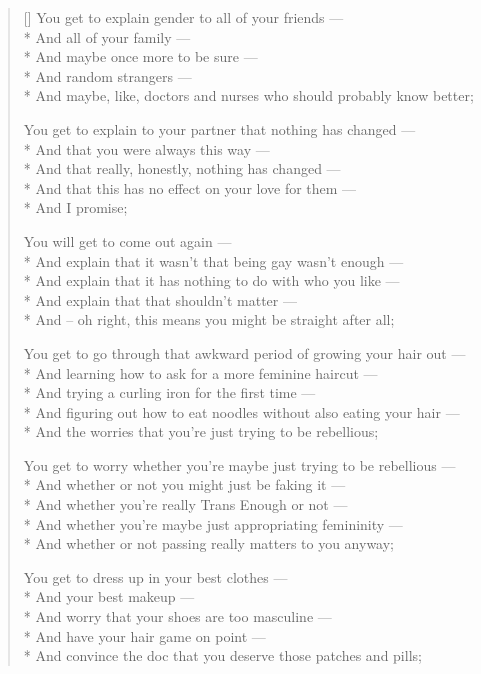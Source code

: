 \begin{verse}[\textwidth]
  You get to explain gender to all of your friends ---\\*
  \vin And all of your family ---\\*
  \vin And maybe once more to be sure ---\\*
  \vin And random strangers ---\\*
  \vin And maybe, like, doctors and nurses who should probably know better;

  You get to explain to your partner that nothing has changed ---\\*
  \vin And that you were always this way ---\\*
  \vin And that really, honestly, nothing has changed ---\\*
  \vin And that this has no effect on your love for them ---\\*
  \vin And I promise;

  You will get to come out again ---\\*
  \vin And explain that it wasn't that being gay wasn't enough ---\\*
  \vin And explain that it has nothing to do with who you like ---\\*
  \vin And explain that that shouldn't matter ---\\*
  \vin And -- oh right, this means you might be straight after all;

  You get to go through that awkward period of growing your hair out ---\\*
  \vin And learning how to ask for a more feminine haircut ---\\*
  \vin And trying a curling iron for the first time ---\\*
  \vin And figuring out how to eat noodles without also eating your hair ---\\*
  \vin And the worries that you're just trying to be rebellious;

  You get to worry whether you're maybe just trying to be rebellious ---\\*
  \vin And whether or not you might just be faking it ---\\*
  \vin And whether you're really Trans Enough or not ---\\*
  \vin And whether you're maybe just appropriating femininity ---\\*
  \vin And whether or not passing really matters to you anyway;

  You get to dress up in your best clothes ---\\*
  \vin And your best makeup ---\\*
  \vin And worry that your shoes are too masculine ---\\*
  \vin And have your hair game on point ---\\*
  \vin And convince the doc that you deserve those patches and pills;


\end{verse}
